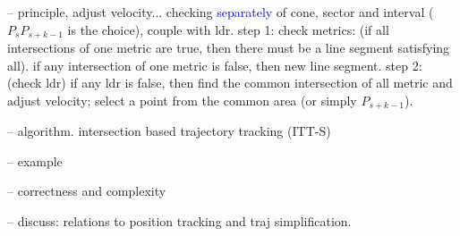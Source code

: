 -- principle, adjust velocity...
	checking \textcolor{blue}{separately} of cone, sector and interval ($P_sP_{s+k-1}$ is the choice), couple with ldr.
	step 1: check metrics: (if all intersections of one metric are true, then there must be a line segment satisfying all).
	if any intersection of one metric is false, then new line segment.
	step 2:	(check ldr) if any ldr is false, then find the common intersection of all metric and adjust velocity; select a point from the common area (or simply $P_{s+k-1}$).

-- algorithm. intersection based trajectory tracking (ITT-S)

-- example

-- correctness and complexity


-- discuss: relations to position tracking and traj simplification.
